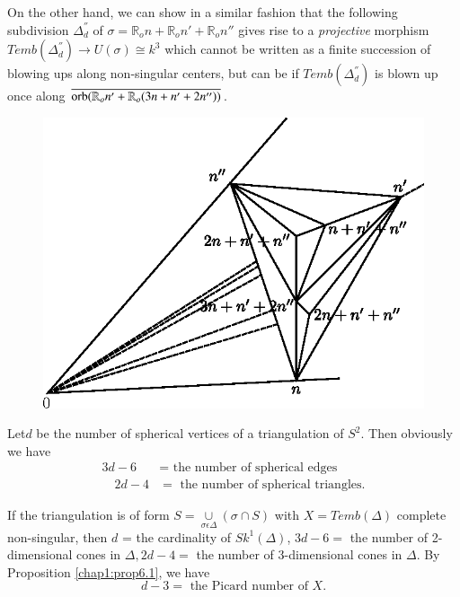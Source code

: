 \begin{remark*}
On the other hand, we can show in a similar fashion that the following
subdivision $\Delta^{''}_{d}$  of $\sigma = \mathbb{R}_on +
\mathbb{R}_on' + \mathbb{R}_on''$ 
gives rise to a {\em{projective}} morphism $Temb
(\Delta^{''}_{d})\to U(\sigma)\cong k^3$ which cannot be written as a
finite succession of blowing ups along non-singular centers, but can
be if $Temb(\Delta^{''}_{d})$ is blown up once  along
$\overline{\operatorname{orb}(\mathbb{R}_on' + \mathbb{R}_o(3n + n' + 2n''))}$. 
\begin{figure}[H]
\centering 
\includegraphics{vol58-fig/fig58-29.eps} 
\end{figure}

\end{remark*}

Let\pageoriginale $d$ be the number of spherical vertices of a
triangulation of $S^2$. Then obviously we have  
\begin{align*}
3d-6 & = \text{ the number of spherical edges }\\
\quad 2d-4 & = \text{ the number of spherical triangles}.\tag{*}
\end{align*}

\noindent
If the triangulation is of form $ S = 
\underset{\sigma\epsilon\Delta}{\cup}(\sigma \cap S)$ with $ X =
Temb(\Delta)$ complete non-singular, then $d$ = the cardinality of
$Sk^1(\Delta)$, $3d - 6 = $ the number of 2-dimensional cones in
$\Delta, 2d -4 =$ the number of 3-dimensional cones in $\Delta$. By
Proposition \ref{chap1:prop6.1}, we have  
$$
d-3=\text{ the Picard number of }X. 
$$ 

